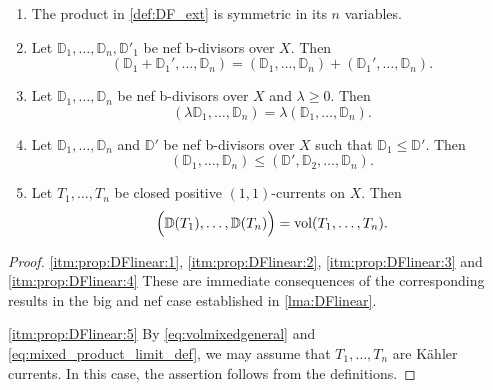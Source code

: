 \begin{proposition}\label{prop:DFlinear}\leavevmode
    \begin{enumerate}
        \item\label{itm:prop:DFlinear:1} The product in \cref{def:DF_ext} is symmetric in its $n$ variables.
        \item\label{itm:prop:DFlinear:2} Let $\mathbb{D}_1,\ldots,\mathbb{D}_n,\mathbb{D}'_1$ be nef b-divisors over $X$. Then
        \[
        \left(\mathbb{D}_1+\mathbb{D}_1',\ldots,\mathbb{D}_n \right)=\left(\mathbb{D}_1,\ldots,\mathbb{D}_n \right)+\left(\mathbb{D}_1',\ldots,\mathbb{D}_n \right).
        \]
        \item\label{itm:prop:DFlinear:3} Let $\mathbb{D}_1,\ldots,\mathbb{D}_n$ be nef b-divisors over $X$ and $\lambda\geq 0$. Then
        \[
        \left(\lambda \mathbb{D}_1,\ldots,\mathbb{D}_n \right)=\lambda \left(\mathbb{D}_1,\ldots,\mathbb{D}_n \right).
        \]
        \item\label{itm:prop:DFlinear:4} Let $\mathbb{D}_1,\ldots,\mathbb{D}_n$ and $\mathbb{D}'$ be nef b-divisors over $X$ such that $\mathbb{D}_1\leq \mathbb{D}'$. Then
        \[
            \left(\mathbb{D}_1,\ldots,\mathbb{D}_n  \right)\leq \left(\mathbb{D}',\mathbb{D}_2,\ldots,\mathbb{D}_n  \right).
        \]
        \item\label{itm:prop:DFlinear:5} Let $T_1,\ldots,T_n$ be closed positive $(1,1)$-currents on $X$. Then
        \[
            \Bigl( \mathbb{D}(T_1),\ldots,\mathbb{D}(T_n) \Bigr)= \operatorname{vol} (T_1,\ldots,T_n).
        \]
    \end{enumerate}
\end{proposition}
\begin{proof}
    \ref{itm:prop:DFlinear:1}, \ref{itm:prop:DFlinear:2}, \ref{itm:prop:DFlinear:3} and \ref{itm:prop:DFlinear:4} These are immediate consequences of the corresponding results in the big and nef case established in \cref{lma:DFlinear}.

    \ref{itm:prop:DFlinear:5} By \eqref{eq:volmixedgeneral} and \eqref{eq:mixed_product_limit_def}, we may assume that $T_1,\ldots,T_n$ are Kähler currents. In this case, the assertion follows from the definitions.
\end{proof}



